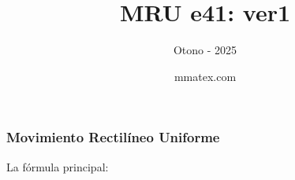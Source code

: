 \documentclass{beamer}
\title{MRU e41: ver1}
\subtitle{Otono - 2025}
\author{mmatex.com}
\begin{document}
\maketitle


\begin{frame}
\frametitle{Movimiento Rectil\'ineo Uniforme}
% 
 La f\'ormula principal:

                                                               
 
{\huge \vmru}
\vNUa
                                                               
                                                               
                                                               
                                                               
\end{frame}
\end{document}
